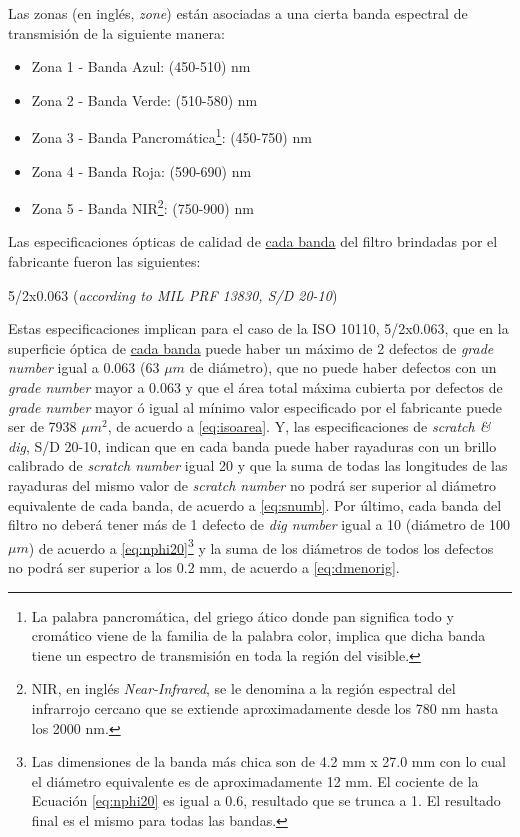 Las zonas (en inglés, \textit{zone}) están asociadas a una cierta banda espectral de transmisión de la siguiente manera:
\begin{itemize}
\justifying
\item Zona 1 - Banda Azul: (450-510) nm
\item Zona 2 - Banda Verde: (510-580) nm
\item Zona 3 - Banda Pancromática\footnote{La palabra pancromática, del griego ático donde pan significa todo y cromático viene de la familia de la palabra color, implica que dicha banda tiene un espectro de transmisión en toda la región del visible.}: (450-750) nm
\item Zona 4 - Banda Roja: (590-690) nm
\item Zona 5 - Banda NIR\footnote{NIR, en inglés \textit{Near-Infrared}, se le denomina a la región espectral del infrarrojo cercano que se extiende aproximadamente desde los 780 nm hasta los 2000 nm.}: (750-900) nm
\end{itemize}
 \hspace{0.5cm}Las especificaciones ópticas de calidad de \underline{cada banda} del filtro brindadas por el fabricante fueron las siguientes:
\begin{center}
5/2x0.063 (\textit{according to MIL PRF 13830, S/D 20-10})
\end{center}
\hspace{0.5cm}Estas especificaciones implican para el caso de la ISO 10110, 5/2x0.063, que en la superficie óptica de \underline{cada banda} puede haber un máximo de 2 defectos de \textit{grade number} igual a 0.063 (63 $\mu m$ de diámetro), que no puede haber defectos con un \textit{grade number} mayor a 0.063 y que el área total máxima cubierta por defectos de \textit{grade number} mayor ó igual al mínimo valor especificado por el fabricante puede ser de 7938 $\mu m^{2}$, de acuerdo a \ref{eq:isoarea}. Y, las especificaciones de \textit{scratch \& dig}, S/D 20-10, indican que en cada banda puede haber rayaduras con un brillo calibrado de \textit{scratch number} igual 20 y que la suma de todas las longitudes de las rayaduras del mismo valor de \textit{scratch number} no podrá ser superior al diámetro equivalente de cada banda, de acuerdo a \ref{eq:snumb}. Por último, cada banda del filtro no deberá tener más de 1 defecto de \textit{dig number} igual a 10 (diámetro de 100 $\mu m$)  de acuerdo a \ref{eq:nphi20}\footnote{Las dimensiones de la banda más chica son de 4.2 mm x 27.0 mm con lo cual el diámetro equivalente es de aproximadamente 12 mm. El cociente de la Ecuación \ref{eq:nphi20} es igual a 0.6, resultado que se trunca a 1. El resultado final es el mismo para todas las bandas.}  y la suma de los diámetros de todos los defectos no podrá ser superior a los 0.2 mm, de acuerdo a \ref{eq:dmenorig}. 

